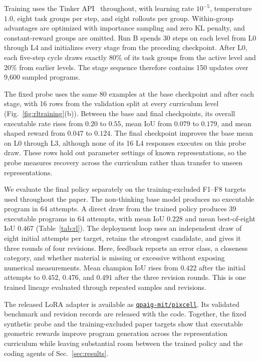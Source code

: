 \documentclass[%
 reprint,
 superscriptaddress,
 amsmath,amssymb,
 aps,
 pra,
 longbibliography,
 floatfix,
]{revtex4-2}
\begin{document}
Training uses the Tinker API~\cite{tinker} throughout, with learning rate $10^{-5}$,
temperature $1.0$, eight task groups per step, and eight rollouts per group.
Within-group advantages are optimized with importance sampling and zero KL
penalty, and constant-reward groups are omitted. Run B spends 30 steps on each
level from L0 through L4 and initializes every stage from the preceding
checkpoint. After L0, each five-step cycle draws exactly 80\% of its task
groups from the active level and 20\% from earlier levels. The stage sequence
therefore contains 150 updates over 9{,}600 sampled programs.

The fixed probe uses the same 80 examples at the base checkpoint and after
each stage, with 16 rows from the validation split at every curriculum level
(Fig.~\ref{fig:rltraining}(b)). Between the base and final checkpoints, its
overall executable rate rises from $0.20$ to $0.55$, mean IoU from $0.079$ to
$0.179$, and mean shaped reward from $0.047$ to $0.124$. The final checkpoint
improves the base mean on L0 through L3, although none of its 16 L4 responses
executes on this probe draw. These rows hold out parameter settings of known
representations, so the probe measures recovery across the curriculum rather
than transfer to unseen representations.

We evaluate the final policy separately on the training-excluded F1--F8
targets used throughout the paper. The non-thinking base model produces no
executable program in 64 attempts. A direct draw from the trained policy
produces 39 executable programs in 64 attempts, with mean IoU $0.228$ and
mean best-of-eight IoU $0.467$ (Table~\ref{tab:rl}). The deployment loop uses
an independent draw of eight initial attempts per target, retains the
strongest candidate, and gives it three rounds of four revisions. Here, feedback
reports an error class, a closeness category, and whether material is missing
or excessive without exposing numerical measurements. Mean champion IoU
rises from $0.422$ after the initial attempts to $0.452$, $0.476$, and $0.491$
after the three revision rounds. This is one trained lineage evaluated
through repeated samples and revisions.



The released LoRA adapter is available as
\href{https://huggingface.co/qpaig-mit/pixcell}{\texttt{qpaig-mit/pixcell}}.
Its validated benchmark and revision records are released with the code.
Together, the fixed synthetic probe and the training-excluded paper targets
show that executable geometric rewards improve program generation across the
representation curriculum while leaving substantial room between the trained
policy and the coding agents of Sec.~\ref{sec:results}.
\end{document}
